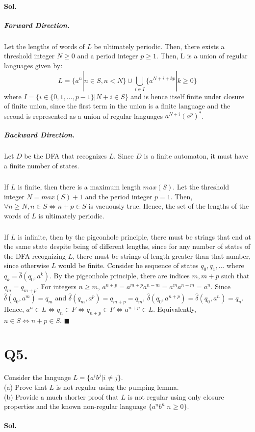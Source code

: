 \documentclass[]{article}
\begin{document}
	\paragraph{Sol.}  
	\subparagraph{Forward Direction.} Let the lengths of words of $L$ be ultimately periodic. Then, there exists a threshold integer $N \geq 0$ and a period integer $p \geq 1$. Then, L is a union of regular languages given by: $$L = \{a^n | n \in S, n < N\} \cup \bigcup_{i \in I} \{a^{N+i+kp} | k \geq 0\}$$ where $I = \{i \in \{0,1, \dots, p-1 \}| N+i \in S\}$ and is hence itself finite under closure of finite union, since the first term in the union is a finite language and the second is represented as a union of regular languages $a^{N+i}(a^p)^*$.
	\subparagraph{Backward Direction.} Let $D$ be the DFA that recognizes $L$. Since $D$ is a finite automaton, it must have a finite number of states. 
	\subparagraph{} If $L$ is finite, then there is a maximum length $max(S)$. Let the threshold integer $N = max(S) + 1$ and the period integer $p = 1$. Then, $\forall n \geq N, n \in S \iff n + p \in S$ is vacuously true. Hence, the set of the lengths of the words of $L$ is ultimately periodic.
	\subparagraph{} If $L$ is infinite, then by the pigeonhole principle, there must be strings that end at the same state despite being of different lengths, since for any number of states of the DFA recognizing $L$, there must be strings of length greater than that number, since otherwise $L$ would be finite. Consider he sequence of states $q_0, q_1, \dots$ where $q_k = \hat{\delta}(q_0, a^k)$. By the pigeonhole principle, there are indices $m, m+p$ such that $q_m = q_{m+p}$. For integers $n \geq m$, $a^{n+p} = a^{m + p} a^{n-m} = a^m a^{n-m} = a^n.$ Since $\hat{\delta}(q_0, a^m) = q_m$ and $\hat{\delta} (q_m, a^p) = q_{m+p} = q_m$, $\hat{\delta}(q_0, a^{n+p}) = \hat{\delta}(q_0, a^n) = q_n$. Hence, $a^n \in L \iff q_n \in F \iff q_{n+p} \in F \iff a^{n+p} \in L$. Equivalently, $n \in S \iff n+p \in S$. $\blacksquare$
	\pagebreak
	\section*{Q5.}
	Consider the language $L=\{a^ib^j | i \neq j\}$. \\
	(a) Prove that $L$ is not regular using the pumping lemma. \\
	(b) Provide a much shorter proof that $L$ is not regular using only closure properties and the known non-regular language $\{a^nb^n | n \geq 0\}$.
	
	\paragraph{Sol.} 
	
\end{document}
